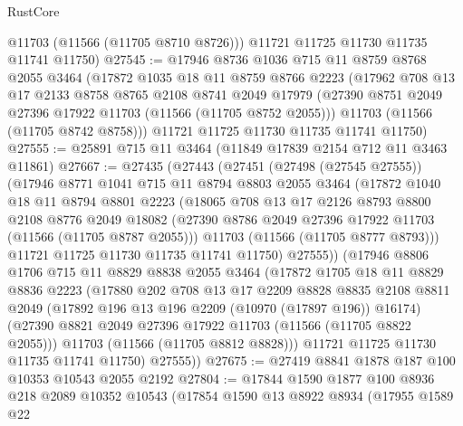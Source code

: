 \begin{lexlean}{RustCore}
\begin{coremodule}
        @11703
        (@11566 (@11705 @8710 @8726)))
      @11721
      @11725
      @11730
      @11735
      @11741
      @11750)
@27545 := @17946
    @8736
    @1036
    @715
    @11
    @8759
    @8768
    @2055
    @3464
    (@17872
      @1035
      @18
      @11
      @8759
      @8766
      @2223
      (@17962
        @708
        @13
        @17
        @2133
        @8758
        @8765
        @2108
        @8741
        @2049
        @17979
        (@27390 @8751 @2049 @27396 @17922 @11703 (@11566 (@11705 @8752 @2055)))
        @11703
        (@11566 (@11705 @8742 @8758)))
      @11721
      @11725
      @11730
      @11735
      @11741
      @11750)
@27555 := @25891 @715 @11 @3464 (@11849 @17839 @2154 @712 @11 @3463 @11861)
@27667 := @27435
    (@27443
      (@27451
        (@27498 (@27545 @27555))
        (@17946
          @8771
          @1041
          @715
          @11
          @8794
          @8803
          @2055
          @3464
          (@17872
            @1040
            @18
            @11
            @8794
            @8801
            @2223
            (@18065
              @708
              @13
              @17
              @2126
              @8793
              @8800
              @2108
              @8776
              @2049
              @18082
              (@27390 @8786 @2049 @27396 @17922 @11703 (@11566 (@11705 @8787 @2055)))
              @11703
              (@11566 (@11705 @8777 @8793)))
            @11721
            @11725
            @11730
            @11735
            @11741
            @11750)
          @27555))
      (@17946
        @8806
        @1706
        @715
        @11
        @8829
        @8838
        @2055
        @3464
        (@17872
          @1705
          @18
          @11
          @8829
          @8836
          @2223
          (@17880
            @202
            @708
            @13
            @17
            @2209
            @8828
            @8835
            @2108
            @8811
            @2049
            (@17892 @196 @13 @196 @2209 (@10970 (@17897 @196)) @16174)
            (@27390 @8821 @2049 @27396 @17922 @11703 (@11566 (@11705 @8822 @2055)))
            @11703
            (@11566 (@11705 @8812 @8828)))
          @11721
          @11725
          @11730
          @11735
          @11741
          @11750)
        @27555))
@27675 := @27419 @8841 @1878 @187 @100 @10353 @10543 @2055 @2192
@27804 := @17844
    @1590
    @1877
    @100
    @8936
    @218
    @2089
    @10352
    @10543
    (@17854
      @1590
      @13
      @8922
      @8934
      (@17955
        @1589
        @22

\end{coremodule}
\end{lexlean}
